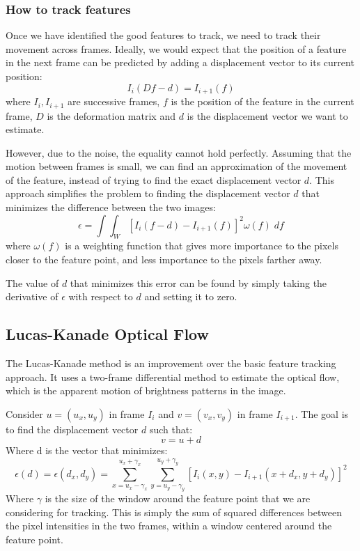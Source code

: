 \subsubsection{How to track features}
Once we have identified the good features to track, we need to track their movement across frames.
Ideally, we would expect that the position of a feature in the next frame can be predicted by adding a displacement vector to its current position:
$$I_i(Df - d) = I_{i+1}(f)$$
where $I_i, I_{i+1}$ are successive frames, $f$ is the position of the feature in the current frame, $D$ is the deformation matrix 
and $d$ is the displacement vector we want to estimate.

However, due to the noise, the equality cannot hold perfectly. Assuming that the motion between frames is small, 
we can find an approximation of the movement of the feature, instead of trying to find the exact displacement vector $d$.
This approach simplifies the problem to finding the displacement vector $d$ that minimizes the difference between the two images:
$$\epsilon = \int \int_{W} [I_i(f - d) -  I_{i+1}(f)]^2 \omega(f) \; df$$
where $\omega(f)$ is a weighting function that gives more importance to the pixels closer to the feature point, and less importance to the pixels farther away.

The value of $d$ that minimizes this error can be found by simply taking the derivative of $\epsilon$ with respect to $d$ and setting it to zero.

\subsection{Lucas-Kanade Optical Flow}
The Lucas-Kanade method is an improvement over the basic feature tracking approach.
It uses a two-frame differential method to estimate the optical flow, which is the apparent motion of brightness patterns in the image.

Consider $u = (u_x, u_y)$ in frame $I_i$ and $v = (v_x, v_y)$ in frame $I_{i+1}$. The goal is to find the displacement vector $d$ such that:
$$v = u + d$$
Where d is the vector that minimizes:
$$\epsilon(d) = \epsilon(d_x, d_y) = \sum_{x = u_x - \gamma_x}^{u_x + \gamma_x} \sum_{y = u_y - \gamma_y}^{u_y + \gamma_y} [I_i(x, y) - I_{i+1}(x + d_x, y + d_y)]^2$$
Where $\gamma$ is the size of the window around the feature point that we are considering for tracking.
This is simply the sum of squared differences between the pixel intensities in the two frames, within a window centered around the feature point.

